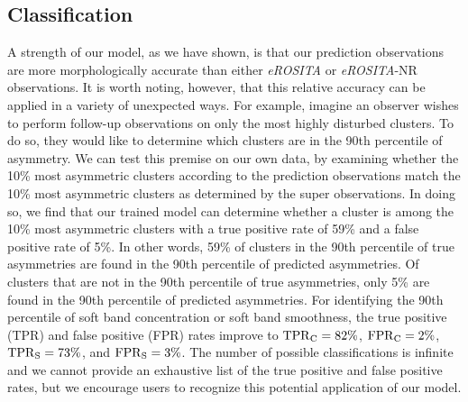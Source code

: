 \documentclass[twocolumn, 11pt]{aastex63}%
\begin{document}
\subsection{Classification}\label{classification}
A strength of our model, as we have shown, is that our prediction observations are more morphologically accurate than either \textit{eROSITA} or \textit{eROSITA}-NR observations. It is worth noting, however, that this relative accuracy can be applied in a variety of unexpected ways. For example, imagine an observer wishes to perform follow-up observations on only the most highly disturbed clusters. To do so, they would like to determine which clusters are in the 90th percentile of asymmetry. We can test this premise on our own data, by examining whether the 10\% most asymmetric clusters according to the prediction observations match the 10\% most asymmetric clusters as determined by the super observations. In doing so, we find that our trained model can determine whether a cluster is among the 10\% most asymmetric clusters with a true positive rate of 59\% and a false positive rate of 5\%. In other words, 59\% of clusters in the 90th percentile of true asymmetries are found in the 90th percentile of predicted asymmetries. Of clusters that are not in the 90th percentile of true asymmetries, only 5\% are found in the 90th percentile of predicted asymmetries. For identifying the 90th percentile of soft band concentration or soft band smoothness, the true positive (TPR) and false positive (FPR) rates improve to $\rm{TPR}_{C} = 82\%$, $\rm{FPR}_{C} = 2\%$, $\rm{TPR}_{S} = 73\%$, and $\rm{FPR}_{S} = 3\%$. The number of possible classifications is infinite and we cannot provide an exhaustive list of the true positive and false positive rates, but we encourage users to recognize this potential application of our model.
\end{document}
